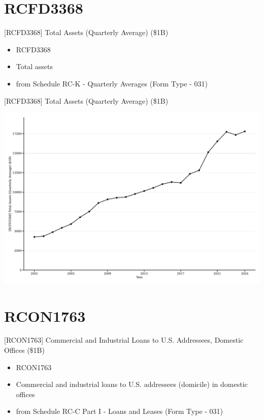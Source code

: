 \documentclass{beamer}
\begin{document}
\section{RCFD3368}
\begin{frame}{[RCFD3368] Total Assets (Quarterly Average) (\$1B)}
\begin{itemize}
    \item RCFD3368
    \item Total assets
    \item from Schedule RC-K - Quarterly Averages (Form Type - 031)
\end{itemize}
\end{frame}

\begin{frame}{[RCFD3368] Total Assets (Quarterly Average) (\$1B)}
\begin{center}
\includegraphics[width=1\textwidth]{figures/Figure_RCFD3368_Total_Assets_Quarterly_Avg.pdf}
\end{center}
\end{frame}


\section{RCON1763}
\begin{frame}{[RCON1763] Commercial and Industrial Loans to U.S. Addressees, Domestic Offices (\$1B)}
\begin{itemize}
    \item RCON1763
    \item Commercial and industrial loans to U.S. addressees (domicile) in domestic offices
    \item from Schedule RC-C Part I - Loans and Leases (Form Type - 031)
\end{itemize}
\end{frame}
\end{document}
